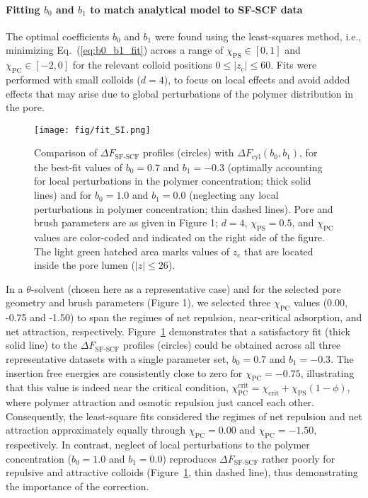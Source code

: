 \documentclass[10pt, a4paper, twocolumn]{article}
\begin{document}
\paragraph{Fitting $b_0$ and $b_1$ to match analytical model to SF-SCF data}

The optimal coefficients $b_0$ and $b_1$ were found using the least-squares method, i.e., minimizing Eq.~(\ref{eq:b0_b1_fit}) across a range of $\chi_{\text{PS}} \in [0,1]$  and $\chi_{\text{PC}} \in [-2,0]$ for the relevant colloid positions $0 \leq |z_{\text{c}}| \leq 60$.
Fits were performed with small colloids ($d=4$), to focus on local effects and avoid added effects that may arise due to global perturbations of the polymer distribution in the pore.

\begin{figure}[]
    \centering
    \texttt{[image: fig/fit\_SI.png]}
    \caption{
    Comparison of $\Delta F_{\text{SF-SCF}}$ profiles (circles) with $\Delta F_{\text{cyl}}(b_0,b_1)$, for the best-fit values of $b_0 = 0.7$ and $b_1 = -0.3$ (optimally accounting for local perturbations in the polymer concentration; thick solid lines) and for $b_0 = 1.0$ and $b_1 = 0.0$ (neglecting any local perturbations in polymer concentration; thin dashed lines).
    Pore and brush parameters are as given in Figure 1; $d = 4$, $\chi_{\text{PS}} = 0.5$, and $\chi_{\text{PC}}$ values are color-coded and indicated on the right side of the figure.
    The light green hatched area marks values of $z_{\text{c}}$ that are located inside the pore lumen ($|z| \leq 26$).
    }
    \label{fig:fit_SI}
\end{figure}

In a $\theta$-solvent (chosen here as a representative case) and for the selected pore geometry and brush parameters (Figure 1), we selected three $\chi_{\text{PC}}$ values (0.00, -0.75 and -1.50) to span the regimes of net repulsion, near-critical adsorption, and net attraction, respectively.
Figure~\ref{fig:fit_SI} demonstrates that a satisfactory fit (thick solid line) to the $\Delta F_{\text{SF-SCF}}$ profiles (circles) could be obtained across all three representative datasets with a single parameter set, $b_0 = 0.7$ and $b_1 = -0.3$.
The insertion free energies are consistently close to zero for $\chi_{\text{PC}} = -0.75$, illustrating that this value is indeed near the critical condition, $\chi_{\text{PC}}^{\text{crit}} = \chi_{\text{crit}} + \chi_{\text{PS}} (1 - \phi)$, where polymer attraction and osmotic repulsion just cancel each other.
Consequently, the least-square fits considered the regimes of net repulsion and net attraction approximately equally through $\chi_{\text{PC}} = 0.00$ and $\chi_{\text{PC}} = -1.50$, respectively.
In contrast, neglect of local perturbations to the polymer concentration ($b_0 = 1.0$ and $b_1 = 0.0$) reproduces $\Delta F_{\text{SF-SCF}}$ rather poorly for repulsive and attractive colloids (Figure~\ref{fig:fit_SI}, thin dashed line), thus demonstrating the importance of the correction.
\end{document}
